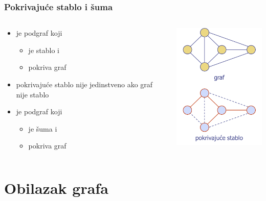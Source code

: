 \documentclass[compress]{beamer}
\begin{document}
\begin{frame}[fragile]
  \frametitle{Pokrivajuće stablo i šuma}
  \begin{columns}
    \begin{column}[t]{6cm}
      \begin{itemize}
        \item {} je podgraf koji
        \begin{itemize}
          \item je stablo i
          \item pokriva graf
        \end{itemize}
        \item pokrivajuće stablo nije jedinstveno ako graf nije stablo
        \item {} je podgraf koji
        \begin{itemize}
          \item je šuma i
          \item pokriva graf
        \end{itemize}
      \end{itemize}
    \end{column}
    \begin{column}[t]{6cm}
      \begin{center}
        \includegraphics[width=5cm]{asp-14-pic17.png}
      \end{center}
    \end{column}
  \end{columns}
\end{frame}

\section[Obilazak grafa]{Obilazak grafa}
\end{document}

